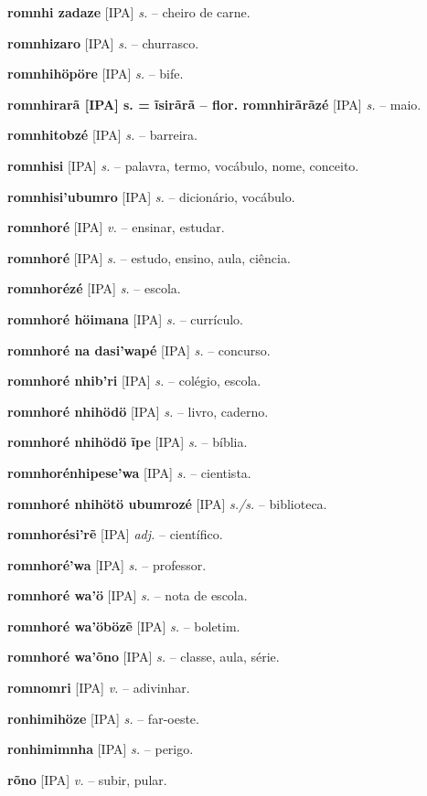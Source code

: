 \textbf{romnhi zadaze} [IPA] \textit{s.} -- cheiro de carne.

\textbf{romnhizaro} [IPA] \textit{s.} -- churrasco.

\textbf{romnhihöpöre} [IPA] \textit{s.} -- bife.

\textbf{romnhirarã [IPA] s. = ĩsirãrã -- flor. romnhirãrãzé} [IPA] \textit{s.} -- maio.

\textbf{romnhitobzé} [IPA] \textit{s.} -- barreira.

\textbf{romnhisi} [IPA] \textit{s.} -- palavra, termo, vocábulo, nome, conceito.

\textbf{romnhisi'ubumro} [IPA] \textit{s.} -- dicionário, vocábulo.

\textbf{romnhoré} [IPA] \textit{v.} -- ensinar, estudar.

\textbf{romnhoré} [IPA] \textit{s.} -- estudo, ensino, aula, ciência.

\textbf{romnhorézé} [IPA] \textit{s.} -- escola.

\textbf{romnhoré höimana} [IPA] \textit{s.} -- currículo.

\textbf{romnhoré na dasi'wapé} [IPA] \textit{s.} -- concurso.

\textbf{romnhoré nhib'ri} [IPA] \textit{s.} -- colégio, escola.

\textbf{romnhoré nhihödö} [IPA] \textit{s.} -- livro, caderno.

\textbf{romnhoré nhihödö ĩpe} [IPA] \textit{s.} -- bíblia.

\textbf{romnhorénhipese'wa} [IPA] \textit{s.} -- cientista.

\textbf{romnhoré nhihötö ubumrozé} [IPA] \textit{s./s.} -- biblioteca.

\textbf{romnhorési'rẽ} [IPA] \textit{adj.} -- científico.

\textbf{romnhoré'wa} [IPA] \textit{s.} -- professor.

\textbf{romnhoré wa'ö} [IPA] \textit{s.} -- nota de escola.

\textbf{romnhoré wa'öbözẽ} [IPA] \textit{s.} -- boletim.

\textbf{romnhoré wa'õno} [IPA] \textit{s.} -- classe, aula, série.

\textbf{romnomri} [IPA] \textit{v.} -- adivinhar.

\textbf{ronhimihöze} [IPA] \textit{s.} -- far-oeste.

\textbf{ronhimimnha} [IPA] \textit{s.} -- perigo.

\textbf{rõno} [IPA] \textit{v.} -- subir, pular.


